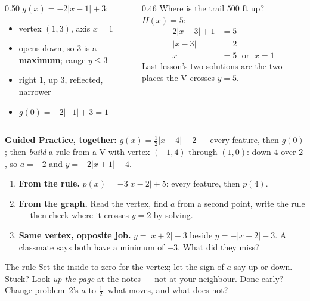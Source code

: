 \documentclass[aspectratio=169, 11pt]{beamer}
\begin{document}
\begin{frame}[t, plain]
  \begin{columns}[T]
    \begin{column}{0.50\textwidth}
      $g(x)=-2|x-1|+3$:
      \begin{itemize}\setlength{\itemsep}{3pt}
        \item vertex $(1,3)$, axis $x=1$
        \item opens down, so $3$ is a \textbf{maximum}; range $y\le3$
        \item right $1$, up $3$, reflected, narrower
        \item $g(0)=-2|{-1}|+3=1$
      \end{itemize}
    \end{column}
    \begin{column}{0.46\textwidth}
      Where is the trail $500$ ft up? $H(x)=5$:
      \begin{align*}
        2|x-3|+1 &= 5 \\
        |x-3| &= 2 \\
        x &= 5 \;\text{ or }\; x = 1
      \end{align*}
      Last lesson's two solutions are the two places the V crosses $y=5$.
    \end{column}
  \end{columns}
  \vspace{4pt}
  \textbf{Guided Practice, together:} $g(x)=\tfrac12|x+4|-2$ --- every feature, then $g(0)$; then
  \emph{build} a rule from a V with vertex $(-1,4)$ through $(1,0)$: down $4$ over $2$, so $a=-2$
  and $y=-2|x+1|+4$.
\end{frame}

\begin{frame}[t, plain]
  \begin{enumerate}\setlength{\itemsep}{6pt}
    \item \textbf{From the rule.} $p(x)=-3|x-2|+5$: every feature, then $p(4)$.
    \item \textbf{From the graph.} Read the vertex, find $a$ from a second point, write the rule
          --- then check where it crosses $y=2$ by solving.
    \item \textbf{Same vertex, opposite job.} $y=|x+2|-3$ beside $y=-|x+2|-3$. A classmate says
          both have a minimum of $-3$. What did they miss?
  \end{enumerate}
  \vspace{5pt}
  \begin{block}{The rule}
    Set the inside to zero for the vertex; let the sign of $a$ say up or down. Stuck? Look \emph{up
    the page} at the notes --- not at your neighbour. Done early? Change problem~2's $a$ to
    $\tfrac12$: what moves, and what does not?
  \end{block}
\end{frame}
\end{document}
